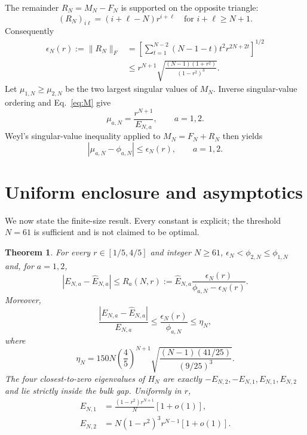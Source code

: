 \documentclass[aps,prb,reprint,superscriptaddress,longbibliography]{revtex4-2}
\newtheorem{theorem}{Theorem}
\begin{document}
The remainder $R_N=M_N-F_N$ is supported on the opposite triangle:
\begin{equation}
 (R_N)_{i\ell}=(i+\ell-N)r^{i+\ell}
 \quad\text{for }i+\ell\geq N+1.
 \label{eq:R}
\end{equation}
Consequently
\begin{align}
 \epsilon_N(r):=\|R_N\|_F
 &=\left[\sum_{t=1}^{N-2}(N-1-t)t^2r^{2N+2t}\right]^{1/2}
 \label{eq:epsilon}\\
 &\leq r^{N+1}
 \sqrt{\frac{(N-1)(1+r^2)}{(1-r^2)^3}}.
 \label{eq:epssimple}
\end{align}
Let $\mu_{1,N}\geq\mu_{2,N}$ be the two largest singular values of $M_N$.
Inverse singular-value ordering and Eq.~\eqref{eq:M} give
\begin{equation}
 \mu_{a,N}=\frac{r^{N+1}}{E_{N,a}},\qquad a=1,2.
 \label{eq:muE}
\end{equation}
Weyl's singular-value inequality applied to $M_N=F_N+R_N$ then yields
\begin{equation}
 |\mu_{a,N}-\phi_{a,N}|\leq\epsilon_N(r),\qquad a=1,2.
 \label{eq:weyl}
\end{equation}

\section{Uniform enclosure and asymptotics}
\label{sec:theorem}

We now state the finite-size result.  Every constant is explicit; the
threshold $N=61$ is sufficient and is not claimed to be optimal.

\begin{theorem}
For every $r\in[1/5,4/5]$ and integer $N\geq61$,
$\epsilon_N<\phi_{2,N}\leq\phi_{1,N}$ and, for $a=1,2$,
\begin{equation}
 |E_{N,a}-\widehat E_{N,a}|\leq
 R_a(N,r):=\widehat E_{N,a}
 \frac{\epsilon_N(r)}{\phi_{a,N}-\epsilon_N(r)}.
 \label{eq:absolute}
\end{equation}
Moreover,
\begin{equation}
 \frac{|E_{N,a}-\widehat E_{N,a}|}{E_{N,a}}
 \leq\frac{\epsilon_N(r)}{\phi_{a,N}}
 \leq\eta_N,
 \label{eq:relative}
\end{equation}
where
\begin{equation}
 \eta_N=150N\left(\frac45\right)^{N+1}
 \sqrt{\frac{(N-1)(41/25)}{(9/25)^3}}.
 \label{eq:eta}
\end{equation}
The four closest-to-zero eigenvalues of $H_N$ are exactly
$-E_{N,2},-E_{N,1},E_{N,1},E_{N,2}$ and lie strictly inside the bulk gap.
Uniformly in $r$,
\begin{align}
 E_{N,1}&=\frac{(1-r^2)r^{N+1}}{N}[1+o(1)],\nonumber\\
 E_{N,2}&=N(1-r^2)^3r^{N-1}[1+o(1)].
 \label{eq:asymptotic}
\end{align}
\end{theorem}
\end{document}
